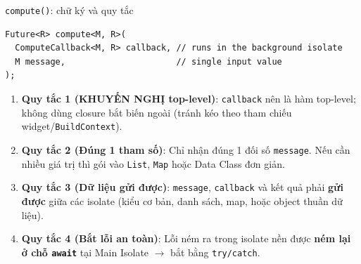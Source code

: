 \documentclass[aspectratio=169,11pt]{beamer}
\begin{document}
\begin{frame}[fragile]{\texttt{compute()}: chữ ký và quy tắc}
\begin{lstlisting}
Future<R> compute<M, R>(
  ComputeCallback<M, R> callback, // runs in the background isolate
  M message,                      // single input value
);
\end{lstlisting}
  \vspace{0.1cm}
  \begin{enumerate}
    \setlength{\itemsep}{0.14cm}
    \item \textbf{Quy tắc 1 (KHUYẾN NGHỊ top-level)}: \texttt{callback} nên là hàm top-level; không dùng closure bắt biến ngoài (tránh kéo theo tham chiếu widget/\texttt{BuildContext}).
    \item \textbf{Quy tắc 2 (Đúng 1 tham số)}: Chỉ nhận đúng 1 đối số \texttt{message}. Nếu cần nhiều giá trị thì gói vào \texttt{List}, \texttt{Map} hoặc Data Class đơn giản.
    \item \textbf{Quy tắc 3 (Dữ liệu gửi được)}: \texttt{message}, \texttt{callback} và kết quả phải \textbf{gửi được} giữa các isolate (kiểu cơ bản, danh sách, map, hoặc object thuần dữ liệu).
    \item \textbf{Quy tắc 4 (Bắt lỗi an toàn)}: Lỗi ném ra trong isolate nền được \textbf{ném lại ở chỗ \texttt{await}} tại Main Isolate $\rightarrow$ bắt bằng \texttt{try/catch}.
  \end{enumerate}
\end{frame}
\end{document}
